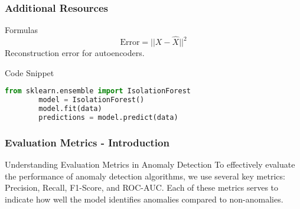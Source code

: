 \documentclass{beamer}
\begin{document}
\begin{frame}[fragile]
    \frametitle{Additional Resources}
    \begin{block}{Formulas}
        \begin{equation}
            \text{Error} = ||X - \hat{X}||^2
        \end{equation}
        Reconstruction error for autoencoders.
    \end{block}
    \begin{block}{Code Snippet}
        \begin{lstlisting}[language=Python]
        from sklearn.ensemble import IsolationForest
        model = IsolationForest()
        model.fit(data)
        predictions = model.predict(data)
        \end{lstlisting}
    \end{block}
\end{frame}

\begin{frame}[fragile]
    \frametitle{Evaluation Metrics - Introduction}
    \begin{block}{Understanding Evaluation Metrics in Anomaly Detection}
        To effectively evaluate the performance of anomaly detection algorithms, we use several key metrics: Precision, Recall, F1-Score, and ROC-AUC. Each of these metrics serves to indicate how well the model identifies anomalies compared to non-anomalies.
    \end{block}
\end{frame}
\end{document}
